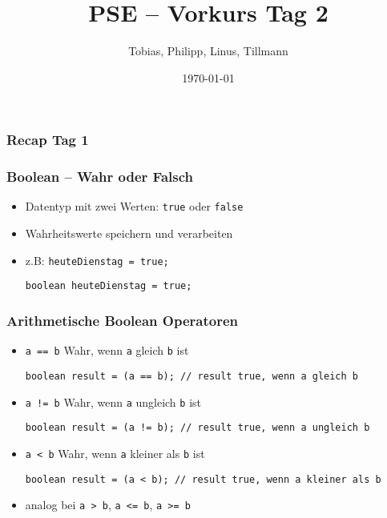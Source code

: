 \documentclass{../../presentation}
\title{PSE – Vorkurs Tag 2}
\author{Tobias, Philipp, Linus, Tillmann}
\institute{FIUS - Fachgruppe Informatik Universität Stuttgart}
\date{\today}
\begin{document}
\begin{frame}
  \titlepage
\end{frame}

\begin{frame}
  \listoftodos
\end{frame}

\begin{frame}
  \frametitle{Recap Tag 1}
\end{frame}



\begin{frame}[fragile]
  \frametitle{Boolean – Wahr oder Falsch}
  \begin{itemize}
    \item Datentyp mit zwei Werten: \texttt{true} oder \texttt{false}
    \item Wahrheitswerte speichern und verarbeiten

    \item z.B: \texttt{heuteDienstag = true;}
    \begin{verbatim}
boolean heuteDienstag = true;
    \end{verbatim}
 
  \end{itemize}
\end{frame}



\begin{frame}[fragile]
  \frametitle{Arithmetische Boolean Operatoren}


  \begin{itemize}
    \item<1->\texttt{a == b} \quad Wahr, wenn \texttt{a} gleich \texttt{b} ist
    \begin{verbatim}
boolean result = (a == b); // result true, wenn a gleich b
    \end{verbatim}

    \item<2->\texttt{a != b} \quad Wahr, wenn \texttt{a} ungleich \texttt{b} ist
    \begin{verbatim}
boolean result = (a != b); // result true, wenn a ungleich b
    \end{verbatim}

    \item<3->\texttt{a < b} \quad Wahr, wenn \texttt{a} kleiner als \texttt{b} ist
    \begin{verbatim}
boolean result = (a < b); // result true, wenn a kleiner als b
    \end{verbatim}

    \item<4->analog bei \texttt{a > b}, \texttt{a <= b}, \texttt{a >= b} \quad
  \end{itemize}
\end{frame}
\end{document}
